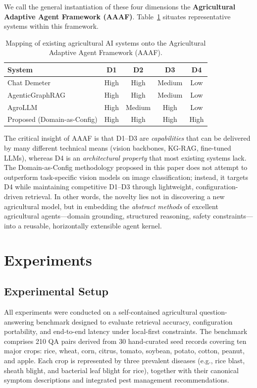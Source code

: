 \documentclass[11pt,a4paper]{article}
\begin{document}
We call the general instantiation of these four dimensions the \textbf{Agricultural Adaptive Agent Framework (AAAF)}. Table~\ref{tab:aaaf_comparison} situates representative systems within this framework.

\begin{table}[htbp]
\centering
\caption{Mapping of existing agricultural AI systems onto the Agricultural Adaptive Agent Framework (AAAF).}
\label{tab:aaaf_comparison}
\begin{tabular}{p{2.8cm}cccc}
\hline
\textbf{System} & \textbf{D1} & \textbf{D2} & \textbf{D3} & \textbf{D4} \\
\hline
Chat Demeter \cite{chatdemeter2025} & High & High & Medium & Low \\
AgenticGraphRAG \cite{agenticgraphrag2025} & High & High & Medium & Low \\
AgroLLM \cite{samuel2025agrollm} & High & Medium & High & Low \\
Proposed (Domain-as-Config) & High & High & High & High \\
\hline
\end{tabular}
\end{table}

The critical insight of AAAF is that D1--D3 are \textit{capabilities} that can be delivered by many different technical means (vision backbones, KG-RAG, fine-tuned LLMs), whereas D4 is an \textit{architectural property} that most existing systems lack. The Domain-as-Config methodology proposed in this paper does not attempt to outperform task-specific vision models on image classification; instead, it targets D4 while maintaining competitive D1--D3 through lightweight, configuration-driven retrieval. In other words, the novelty lies not in discovering a new agricultural model, but in embedding the \textit{abstract methods} of excellent agricultural agents---domain grounding, structured reasoning, safety constraints---into a reusable, horizontally extensible agent kernel.

\section{Experiments}
\label{sec:experiments}

\subsection{Experimental Setup}

All experiments were conducted on a self-contained agricultural question-answering benchmark designed to evaluate retrieval accuracy, configuration portability, and end-to-end latency under local-first constraints. The benchmark comprises 210 QA pairs derived from 30 hand-curated seed records covering ten major crops: rice, wheat, corn, citrus, tomato, soybean, potato, cotton, peanut, and apple. Each crop is represented by three prevalent diseases (e.g., rice blast, sheath blight, and bacterial leaf blight for rice), together with their canonical symptom descriptions and integrated pest management recommendations.
\end{document}
